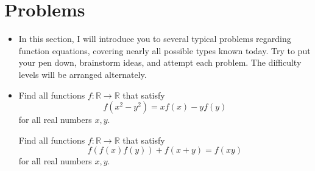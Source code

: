 \documentclass[11pt]{scrartcl}
\begin{document}
    \section{\LARGE{Problems}}
    \vspace{1em}
    \begin{itemize}[label=,itemsep=0.4em,leftmargin=0em]
       \item In this section, I will introduce you to several typical problems regarding function equations, covering nearly all possible types known today. Try to put your pen down, brainstorm ideas, and attempt each problem. The difficulty levels will be arranged alternately.
    
    \item\begin{btvn}
        Find all functions $f: \mathbb{R} \to \mathbb{R}$ that satisfy
        \[
           f(x^2 - y^2) = xf(x) - yf(y)
        \]
        for all real numbers $x,y$.
    \end{btvn}
    \begin{comment}
        Let \( P(x, y) \) denote the plugging into \((?)\). From \( P(x, 0) \) we get \( f(x^2) = xf(x) \). Substituting \( x \to -x \), we find that \( f \) is an odd function. Rewriting, we have
            \[
            f(x^2 - y^2) = f(x^2) - f(y^2), \quad \forall x, y \geq 0.
            \]
            Or \( f(x - y) = f(x) - f(y), \forall x, y \geq 0 \). Substituting \( x \to x + y \), we get \( f(x) + f(y) = f(x + y), \forall x, y \geq 0 \). Furthermore, we have 
            \[
            -f(x) - f(y) = -f(x + y) \implies f(-x) + f(-y) = f(-x - y), \forall x, y \geq 0.
            \]
            Thus, \( f \) is additive over \(\mathbb{R}\). Hence, for any \( k \in \mathbb{Q} \), we have \( f(kx) = kf(x) \). Let \( a = f(1) \). For \( x \in \mathbb{R} \) and \( y \in \mathbb{Q} \), we will compute \( f((x + y)^2) \) in two ways. We have 
            \[
            f((x + y)^2) = (x + y)f(x + y) = (x + y)(f(x) + ay) = xf(x) + yf(x) + axy + ay^2.
            \]
            We also have 
            \[
            f((x + y)^2) = f(x^2 + 2xy + y^2) = f(x^2) + f(2xy) + f(y^2) = xf(x) + 2yf(x) + ay^2.
            \]
            Fix \( x \) and compare the coefficients of \( y \), we obtain \(\boxed{f(x) = ax, \forall x \in \mathbb{R}}\) where \( a \in \mathbb{R} \).
    \end{comment}
    \begin{btvn}
        Find all functions $f: \mathbb{R} \to \mathbb{R}$ that satisfy
        \[
           f(f(x)f(y)) + f(x + y) = f(xy)\tag{1}
        \]
        for all real numbers $x,y$.
    \end{btvn}
    \begin{comment}
            Let \( P(x, y) \) denote plugging into \((?)\).


\end{comment}
\end{itemize}
\end{document}
